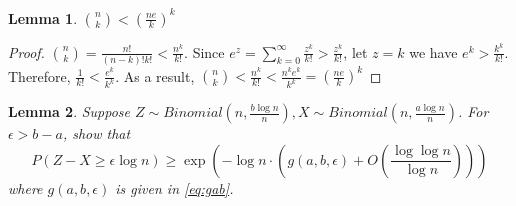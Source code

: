 \documentclass{article}
\newtheorem{lemma}{Lemma}
\begin{document}
\begin{lemma}\label{lem:nk}
	$\binom{n}{k} < (\frac{ne}{k})^k$
\end{lemma}
\begin{proof}
	$\binom{n}{k} = \frac{n!}{(n-k)!k!} < \frac{n^k}{k!}$.
	Since $e^z = \sum_{k=0}^{\infty} \frac{z^k}{k!} > \frac{z^k}{k!}$,
	let $z=k$ we have $e^k > \frac{k^k}{k!}$.
	Therefore, $\frac{1}{k!} < \frac{e^k}{k^k}$.
	As a result, $\binom{n}{k}  < \frac{n^k}{k!} < \frac{n^k e^k}{k^k}
	= (\frac{ne}{k})^k$
\end{proof}


\begin{lemma}\label{lem:lower_bound}
	Suppose $Z \sim Binomial(n, \frac{b\log n}{n}), X\sim Binomial(n, \frac{a\log n}{n})$.
	For $ \epsilon > b - a$, show that
	\begin{equation}
	P(Z - X \geq \epsilon \log n) \geq \exp(-\log n \cdot ( g(a, b, \epsilon) + O(\frac{\log \log n}{\log n})))
	\end{equation}
	where $g(a,b,\epsilon)$ is given in \eqref{eq:gab}.
\end{lemma}
\end{document}
